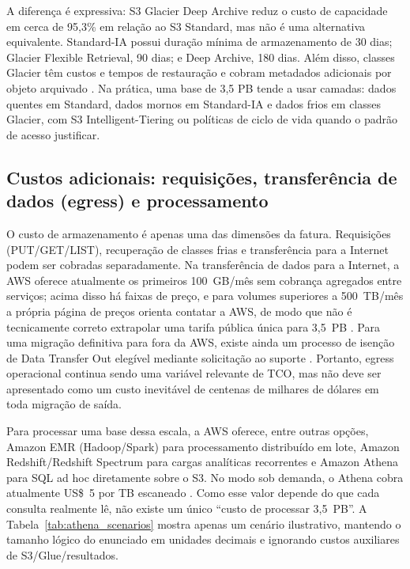 \documentclass[11pt,a4paper]{article}
\begin{document}
A diferença é expressiva: S3 Glacier Deep Archive reduz o custo de capacidade em cerca de 95,3\% em relação ao S3 Standard, mas não é uma alternativa equivalente. Standard-IA possui duração mínima de armazenamento de 30 dias; Glacier Flexible Retrieval, 90 dias; e Deep Archive, 180 dias. Além disso, classes Glacier têm custos e tempos de restauração e cobram metadados adicionais por objeto arquivado \cite{s3pricing}. Na prática, uma base de 3,5 PB tende a usar camadas: dados quentes em Standard, dados mornos em Standard-IA e dados frios em classes Glacier, com S3 Intelligent-Tiering ou políticas de ciclo de vida quando o padrão de acesso justificar.

\subsection{Custos adicionais: requisições, transferência de dados (egress) e processamento}
O custo de armazenamento é apenas uma das dimensões da fatura. Requisições (PUT/GET/LIST), recuperação de classes frias e transferência para a Internet podem ser cobradas separadamente. Na transferência de dados para a Internet, a AWS oferece atualmente os primeiros 100~GB/mês sem cobrança agregados entre serviços; acima disso há faixas de preço, e para volumes superiores a 500~TB/mês a própria página de preços orienta contatar a AWS, de modo que não é tecnicamente correto extrapolar uma tarifa pública única para 3,5~PB \cite{s3pricing}. Para uma migração definitiva para fora da AWS, existe ainda um processo de isenção de Data Transfer Out elegível mediante solicitação ao suporte \cite{s3freeegress}. Portanto, egress operacional continua sendo uma variável relevante de TCO, mas não deve ser apresentado como um custo inevitável de centenas de milhares de dólares em toda migração de saída.

Para processar uma base dessa escala, a AWS oferece, entre outras opções, Amazon EMR (Hadoop/Spark) para processamento distribuído em lote, Amazon Redshift/Redshift Spectrum para cargas analíticas recorrentes e Amazon Athena para SQL ad hoc diretamente sobre o S3. No modo sob demanda, o Athena cobra atualmente US\$~5 por TB escaneado \cite{athena}. Como esse valor depende do que cada consulta realmente lê, não existe um único ``custo de processar 3,5~PB''. A Tabela~\ref{tab:athena_scenarios} mostra apenas um cenário ilustrativo, mantendo o tamanho lógico do enunciado em unidades decimais e ignorando custos auxiliares de S3/Glue/resultados.
\end{document}
